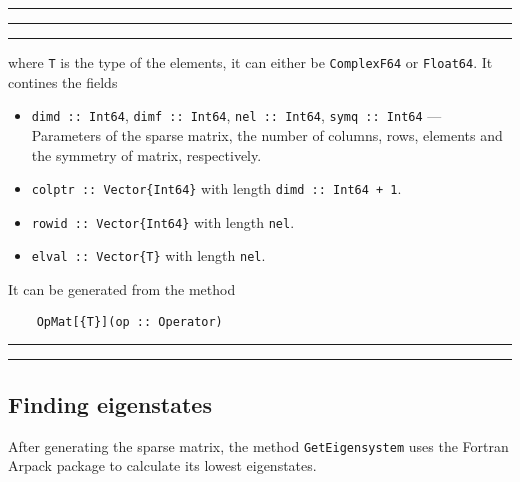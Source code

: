 \documentclass{timesjhep}
\newenvironment{block}[1]{\vspace{0.4\baselineskip}\hrule\vspace{0.10\baselineskip}\hrule\vspace{0.30\baselineskip}{\bfseries #1}\vspace{0.2\baselineskip}\hrule\vspace{0.3\baselineskip}
}{\vspace{0.2\baselineskip}\hrule\vspace{0.10\baselineskip}\hrule\vspace{0.5\baselineskip}}
\begin{document}
\begin{block}{\lstinline|OpMat{T}| --- Type}
\noindent where \lstinline|T| is the type of the elements, it can either be \lstinline|ComplexF64| or \lstinline|Float64|. It contines the fields
\begin{itemize}
    \item \lstinline|dimd :: Int64|, \lstinline|dimf :: Int64|, \lstinline|nel :: Int64|, \lstinline|symq :: Int64| --- Parameters of the sparse matrix, the number of columns, rows, elements and the symmetry of matrix, respectively.
    \item \lstinline|colptr :: Vector{Int64}| with length \lstinline|dimd :: Int64 + 1|.
    \item \lstinline|rowid :: Vector{Int64}| with length \lstinline|nel|.
    \item \lstinline|elval :: Vector{T}| with length \lstinline|nel|.
\end{itemize}
It can be generated from the method
\begin{lstlisting}
    OpMat[{T}](op :: Operator)
\end{lstlisting}
\end{block}

\subsection{Finding eigenstates}
\label{sec:ed_diag}

After generating the sparse matrix, the method \lstinline|GetEigensystem| uses the Fortran Arpack package to calculate its lowest eigenstates. 
\end{document}
